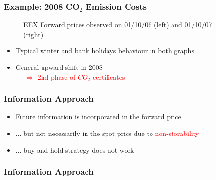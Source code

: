 {{{{{{{{{{{{{{{{{\begin{frame}
  \frametitle{Example: 2008 CO$_2$ Emission Costs}
\vspace{-0.5cm}

\begin{figure}[htbp]
  \centering
  \caption{EEX Forward prices observed on 01/10/06 (left) and 01/10/07 (right)}
\end{figure}

\begin{itemize}
\item Typical winter and bank holidays behaviour in both graphs
\item General upward shift in 2008 \\ \vspace{0.2cm}
\textcolor{red}{$~~~~~~ \Rightarrow$ 2nd phase of $CO_2$ certificates}
\end{itemize}
\end{frame}



\begin{frame}
 \frametitle{Information Approach}
\vspace{-0.5cm}

\begin{itemize}
\item<1-> Future information is incorporated in the forward price
\item<2-> ... but not necessarily in the spot price due to \textcolor{red}{non-storability}
\item<3-> ... buy-and-hold strategy does not work
\end{itemize}
\end{frame}


\begin{frame}
  \frametitle{Information Approach}
\vspace{-0.5cm}


\end{frame}}}}}}}}}}}}}}}}}}
